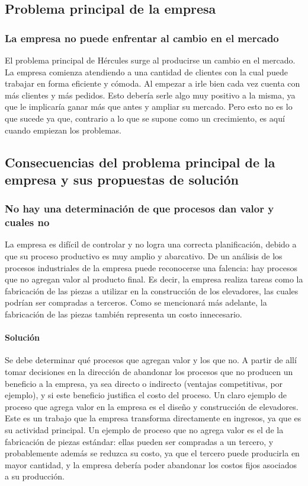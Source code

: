 \subsection{Problema principal de la empresa}
\subsubsection{La empresa no puede enfrentar al cambio en el mercado}
El problema principal de H\'ercules surge al producirse un cambio en el mercado. La empresa comienza atendiendo a una cantidad de clientes con la cual puede trabajar en forma eficiente y c\'omoda. Al empezar a irle bien cada vez cuenta con m\'as clientes y m\'as pedidos. Esto deber\'ia serle algo muy positivo a la misma, ya que le implicar\'ia ganar m\'as que antes y ampliar su mercado. Pero esto no es lo que sucede ya que, contrario a lo que se supone como un crecimiento, es aqu\'i cuando empiezan los problemas.\\

\subsection{Consecuencias del problema principal de la empresa y sus propuestas de soluci\'on}

\subsubsection{No hay una determinaci\'on de que procesos dan valor y cuales no}
La empresa es dif\'icil de controlar y no logra una correcta planificaci\'on, debido a que su proceso productivo es muy amplio y abarcativo. De un an\'alisis de los procesos industriales de la empresa puede reconocerse una falencia: hay procesos que no agregan valor al producto final. Es decir, la empresa realiza tareas como la fabricaci\'on de las piezas a utilizar en la construcci\'on de los elevadores, las cuales podr\'ian ser compradas a terceros. Como se mencionar\'a m\'as adelante, la fabricaci\'on de las piezas tambi\'en representa un costo innecesario.
\paragraph{Soluci\'on}
Se debe determinar qu\'e procesos que agregan valor y los que no. A partir de all\'i tomar decisiones en la direcci\'on de abandonar los procesos que no producen un beneficio a la empresa, ya sea directo o indirecto (ventajas competitivas, por ejemplo), y si este beneficio justifica el costo del proceso. Un claro ejemplo de proceso que agrega valor en la empresa es el dise\~no y construcci\'on de elevadores. Este es un trabajo que la empresa transforma directamente en ingresos, ya que es su actividad principal. Un ejemplo de proceso que no agrega valor es el de la fabricaci\'on de piezas est\'andar: ellas pueden ser compradas a un tercero, y probablemente adem\'as se reduzca su costo, ya que el tercero puede producirla en mayor cantidad, y la empresa deber\'ia poder abandonar los costos fijos asociados a su producci\'on.

